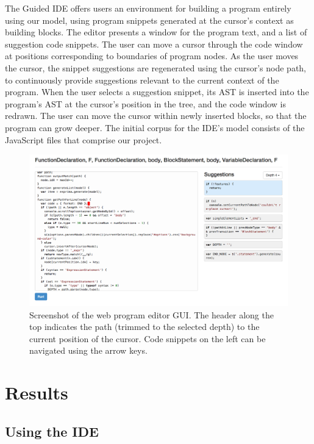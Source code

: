 \documentclass[titlepage]{article}
\begin{document}
The Guided IDE offers users an environment for building a program entirely using
our model, using program snippets generated at the cursor's context as building
blocks. The editor presents a window for the program text, and a list of
suggestion code snippets. The user can move a cursor through the code window at
positions corresponding to boundaries of program nodes. As the user moves the
cursor, the snippet suggestions are regenerated using the cursor's node path, to
continuously provide suggestions relevant to the current context of the program. When the
user selects a suggestion snippet, its AST is inserted into the program's AST at
the cursor's position in the tree, and the code window is redrawn. The user can
move the cursor within newly inserted blocks, so that the program can grow
deeper. The initial corpus for the IDE's model consists of the JavaScript files
that comprise our project.

\begin{figure}[h]
  \centering
  \includegraphics[width=1.00\textwidth]{ide}
  \caption{Screenshot of the web program editor GUI. The header along the top indicates the path (trimmed to the selected depth) to the current position of the cursor. Code snippets on the left can be navigated using the arrow keys.} \label{fig:screenshot}
\end{figure}

\section{Results}

\subsection{Using the IDE}
\end{document}

